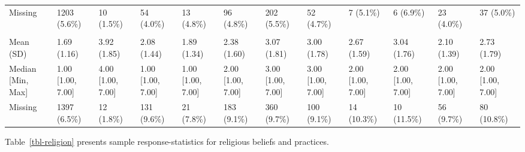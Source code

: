 \documentclass[
  single column]{article}
\begin{document}
\begin{landscape}
\begin{longtable}[t]{llllllllllll}
\hspace{1em}Missing & 1203 (5.6\%) & 10 (1.5\%) & 54 (4.0\%) & 13 (4.8\%) & 96 (4.8\%) & 202 (5.5\%) & 52 (4.7\%) & 7 (5.1\%) & 6 (6.9\%) & 23 (4.0\%) & 37 (5.0\%)\\
\addlinespace[0.3em]
\multicolumn{12}{l}{\textbf{Perceived Religious Discrimination}}\\
\hspace{1em}Mean (SD) & 1.69 (1.16) & 3.92 (1.85) & 2.08 (1.44) & 1.89 (1.34) & 2.38 (1.60) & 3.07 (1.81) & 3.00 (1.78) & 2.67 (1.59) & 3.04 (1.76) & 2.10 (1.39) & 2.73 (1.79)\\
\hspace{1em}Median [Min, Max] & 1.00 [1.00, 7.00] & 4.00 [1.00, 7.00] & 1.00 [1.00, 7.00] & 1.00 [1.00, 7.00] & 2.00 [1.00, 7.00] & 3.00 [1.00, 7.00] & 3.00 [1.00, 7.00] & 2.00 [1.00, 7.00] & 2.00 [1.00, 7.00] & 2.00 [1.00, 7.00] & 2.00 [1.00, 7.00]\\
\hspace{1em}Missing & 1397 (6.5\%) & 12 (1.8\%) & 131 (9.6\%) & 21 (7.8\%) & 183 (9.1\%) & 360 (9.7\%) & 100 (9.1\%) & 14 (10.3\%) & 10 (11.5\%) & 56 (9.7\%) & 80 (10.8\%)\\*

\end{longtable}

\endgroup{}


\end{landscape}

\newpage{}

Table~\ref{tbl-religion} presents sample response-statistics for
religious beliefs and practices.
\end{document}
